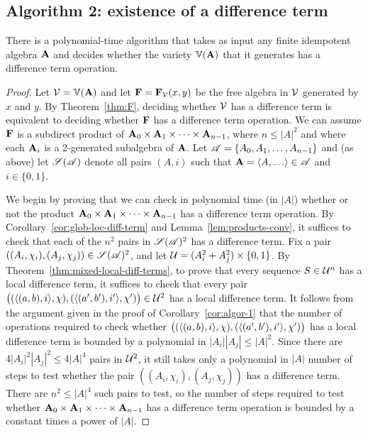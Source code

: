 \subsection{Algorithm 2: existence of a difference term}
\label{sec:algor-2}
\begin{cor}
\label{cor:algor-2}
  There is a polynomial-time algorithm that takes as input
  any finite idempotent algebra $\mathbf{A}$ and decides whether
  the variety $\operatorname{\mathbb{V}}(\mathbf{A})$ that it generates
  has a difference term operation.
\end{cor}
\begin{proof}
  Let $\mathcal{V} = \operatorname{\mathbb{V}}(\mathbf{A})$ and let $\mathbf{F} = \mathbf{F}_{\mathcal{V}}(x,y)$ be the free algebra in
  $\mathcal{V}$ generated by $x$ and $y$.
  By Theorem~\ref{thm:F}, deciding whether $\mathcal{V}$ has a difference term is equivalent to 
  deciding whether $\mathbf{F}$ has a difference term operation.
  We can assume $\mathbf{F}$ is a subdirect product of
  $\mathbf{A}_0 \times \mathbf{A}_1 \times \cdots \times \mathbf{A}_{n-1}$, where $n\leq |A|^2$ and
  where each $\mathbf{A}_i$ is a 2-generated subalgebra of $\mathbf{A}$.
  Let $\mathscr{A} = \{A_0, A_1, \dots, A_{n-1}\}$ and (as above) let $\mathscr{S}(\mathscr{A})$ denote 
  all pairs $(A, i)$ such that $\bA = \<A, \dots\> \in \scA$ and $i\in \{0,1\}$.

  We begin by proving that we can check in polynomial time (in $|A|$)
  whether or not the product
  $\mathbf{A}_0 \times \mathbf{A}_1 \times \cdots \times \mathbf{A}_{n-1}$ has a difference term operation.
  By Corollary~\ref{cor:glob-loc-diff-term} and Lemma~\ref{lem:products-conv},
  it suffices to check that each of the 
  $n^2$ pairs  in 
  $\mathscr{S}(\mathscr{A})^2$ has a \glocal
  difference term.  Fix a pair
  $((A_i, \chi_i), (A_j, \chi_j)) \in  \mathscr{S}(\mathscr{A})^2$,
  and let $\mathcal{U}  = (A_i^2 + A_j^2)\times \{0,1\}$.
  By Theorem~\ref{thm:mixed-local-diff-terms},
  to prove that every sequence $S \in \mathcal{U}^n$
  has a local difference term, it suffices to check that every pair
  $\bigl( (\langle(a, b), i\rangle, \chi), (\langle(a', b'), i'\rangle, \chi')\bigr) \in \mathcal{U}^2$
  has a local difference term. It follows from the argument given 
  in the proof of Corollary~\ref{cor:algor-1} that the number of 
  operations required to check whether
  $\bigl( (\langle(a, b), i\rangle, \chi), (\langle(a', b'), i'\rangle, \chi')\bigr)$
  has a local difference term is bounded by a
  polynomial in $|A_i||A_j|\leq |A|^2$.  Since there are 
  $4|A_i|^2|A_j|^2 \leq 4|A|^4$ pairs in $\mathcal{U}^2$, 
  it still takes only a polynomial in $|A|$ number of steps to test whether
  the pair $((A_i, \chi_i), (A_j, \chi_j))$ has a \glocal difference term.
  There are $n^2 \leq |A|^4$ such pairs to test, so the number of steps required to 
  test whether
  $\mathbf{A}_0 \times \mathbf{A}_1 \times \cdots \times \mathbf{A}_{n-1}$ has a difference term
  operation is bounded by a constant times a power of $|A|$.


\end{proof}
